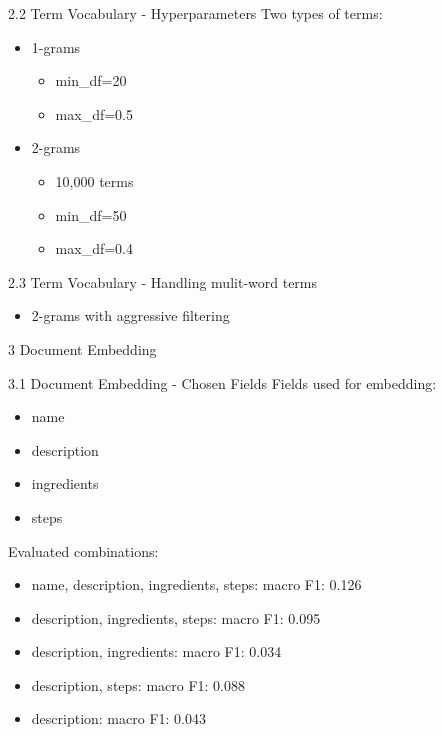 \documentclass{beamer}
\begin{document}
\begin{frame}{2.2 Term Vocabulary - Hyperparameters}
  Two types of terms:
  \begin{itemize}
    \item 1-grams
          \begin{itemize}
            \item min\_df=20
            \item max\_df=0.5
          \end{itemize}
    \item 2-grams
          \begin{itemize}
            \item 10,000 terms
            \item min\_df=50
            \item max\_df=0.4
          \end{itemize}
  \end{itemize}

\end{frame}

\begin{frame}{2.3 Term Vocabulary - Handling mulit-word terms}
  \begin{itemize}
    \item 2-grams with aggressive filtering
  \end{itemize}
\end{frame}

\begin{frame}{3 Document Embedding}
\end{frame}

\begin{frame}{3.1 Document Embedding - Chosen Fields}
  Fields used for embedding:
  \begin{itemize}
    \item name
    \item description
    \item ingredients
    \item steps
  \end{itemize}

  Evaluated combinations:
  \begin{itemize}
    \item name, description, ingredients, steps: macro F1: 0.126
    \item description, ingredients, steps: macro F1: 0.095
    \item description, ingredients: macro F1: 0.034
    \item description, steps: macro F1: 0.088
    \item description: macro F1: 0.043
  \end{itemize}

\end{frame}
\end{document}

